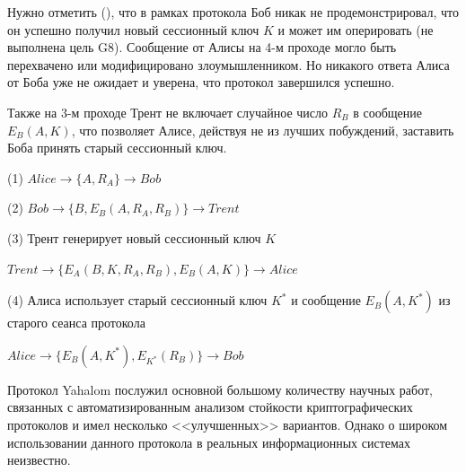 Нужно отметить (\cite{Zhou:Yu:Pan:Wang:2016}), что в рамках протокола Боб никак не продемонстрировал, что он успешно получил новый сессионный ключ $K$ и может им оперировать (не выполнена цель G8). Сообщение от Алисы на 4-м проходе могло быть перехвачено или модифицировано злоумышленником. Но никакого ответа Алиса от Боба уже не ожидает и уверена, что протокол завершился успешно.

Также на 3-м проходе Трент не включает случайное число $R_B$ в сообщение $E_B(A, K)$, что позволяет Алисе, действуя не из лучших побуждений, заставить Боба принять старый сессионный ключ.

\begin{protocol}
	\item[(1)] $Alice \to \{ A, R_A \} \to Bob$
	\item[(2)] $Bob \to \{ B, E_B( A, R_A, R_B ) \} \to Trent$
	\item[(3)] Трент генерирует новый сессионный ключ $K$
	\item[{}] $Trent \to \{ E_A( B, K, R_A, R_B ), E_B(A, K) \} \to Alice$
	\item[(4)] Алиса использует старый сессионный ключ $K^*$ и сообщение $E_B( A, K^* )$ из старого сеанса протокола
	\item[{}] $Alice \to \{ E_B( A, K^* ), E_{K^*}( R_B ) \} \to Bob$
\end{protocol}

Протокол Yahalom послужил основной большому количеству научных работ, связанных с автоматизированным анализом стойкости криптографических протоколов и имел несколько <<улучшенных>> вариантов. Однако о широком использовании данного протокола в реальных информационных системах неизвестно.

